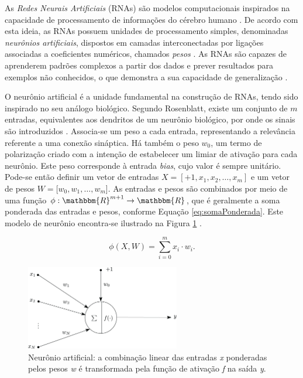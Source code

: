 
As \emph{Redes Neurais Artificiais} (RNAs) são modelos computacionais inspirados na capacidade de processamento de informações do cérebro humano \cite{ref:rojas}. De acordo com esta ideia, as RNAs possuem unidades de processamento simples, denominadas \emph{neurônios artificiais}, dispostos em camadas interconectadas por ligações associadas a coeficientes numéricos, chamados \emph{pesos} \cite{ref:faceli}. As RNAs são capazes de aprenderem padrões complexos a partir dos dados e prever resultados para exemplos não conhecidos, o que demonstra a sua capacidade de generalização \cite{ref:haykin}.


O neurônio artificial é a unidade fundamental na construção de RNAs, tendo sido inspirado no seu análogo biológico. Segundo Rosenblatt, existe um conjunto de $m$ entradas, equivalentes aos dendritos de um neurônio biológico, por onde os sinais são introduzidos \cite{ref:rosenblatt}. Associa-se um peso a cada entrada, representando a relevância referente a uma conexão sináptica. Há também o peso $w_0$, um termo de polarização criado com a intenção de estabelecer um limiar de ativação para cada neurônio. Este peso corresponde à entrada \emph{bias}, cujo valor é sempre unitário. Pode-se então definir um vetor de entradas $X = [+1, x_1, x_2, \ldots, x_m]$ e um vetor de pesos $W = [w_0, w_1, \ldots, w_m$]. As entradas e pesos são combinados por meio de uma função $\phi: \mathbbm{R}^{m+1} \rightarrow \mathbbm{R}$, que é geralmente a soma ponderada das entradas e pesos, conforme Equação \ref{eq:somaPonderada}. Este modelo de neurônio encontra-se ilustrado na Figura \ref{img:neuronioArtificial} \cite{ref:patrick-tcc}.

\begin{equation}
\phi(X,W) = \sum_{i =0}^m x_i \cdot w_i. \label{eq:somaPonderada}
\end{equation}

\begin{figure}[h!]
	\centering
\includegraphics[width=0.6\textwidth]{./img/neuron}
\caption{Neurônio artificial: a combinação linear das entradas \emph{x} ponderadas pelos pesos \emph{w} é transformada pela função de ativação \emph{f} na saída \emph{y}.}
\label{img:neuronioArtificial}
\end{figure}

